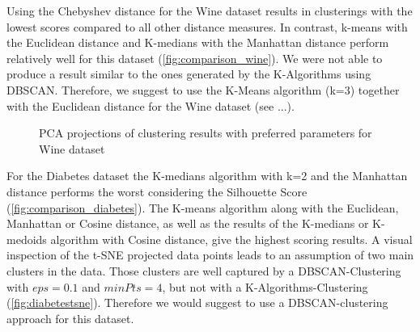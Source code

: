 Using the Chebyshev distance for the Wine dataset results in clusterings with the lowest scores compared to all other distance measures. In contrast, k-means with the Euclidean distance and K-medians with the Manhattan distance perform relatively well for this dataset (\autoref{fig:comparison_wine}). 
We were not able to produce a result similar to the ones generated by the K-Algorithms using DBSCAN.
Therefore, we suggest to use the K-Means algorithm (k=3) together with the Euclidean distance for the Wine dataset (see ...). 

\begin{figure}[H]
	\caption{PCA projections of clustering results with preferred parameters for Wine dataset}
	\label{fig:wine_bestparams}
\end{figure}

For the Diabetes dataset the K-medians algorithm with k=2 and the Manhattan distance performs the worst considering the Silhouette Score (\autoref{fig:comparison_diabetes}). The K-means algorithm along with the Euclidean, Manhattan or Cosine distance, as well as the results of the K-medians or K-medoids algorithm with Cosine distance, give the highest scoring results. A visual inspection of the t-SNE projected data points leads to an assumption of two main clusters in the data. Those clusters are well captured by a DBSCAN-Clustering with $eps = 0.1$ and $minPts = 4$, but not with a K-Algorithms-Clustering (\autoref{fig:diabetestsne}). Therefore we would suggest to use a DBSCAN-clustering approach for this dataset. 

